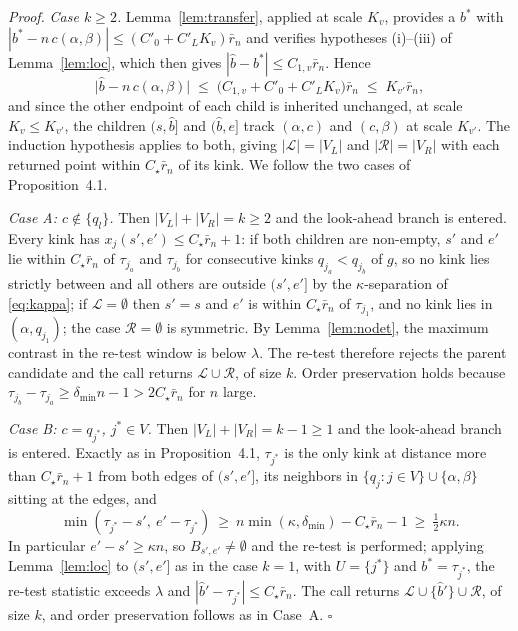 \documentclass[12pt, a4paper]{article}
\newcommand{\qed}{\hfill$\square$}
\newenvironment{proof}[1][Proof]{\par\noindent\textit{#1.}\space}{\qed\par\medskip}
\newcommand{\proppop}{Proposition~4.1}
\begin{document}
\begin{proof}
\emph{Case $k \ge 2$.} Lemma~\ref{lem:transfer}, applied at scale $K_v$,
provides a $b^*$ with
$|b^*-n\,c(\alpha,\beta)|\le(C'_0+C'_LK_v)\bar r_n$ and verifies hypotheses
(i)--(iii) of Lemma~\ref{lem:loc}, which then gives
$|\hat b-b^*|\le C_{1,v}\bar r_n$. Hence
\[
\big| \hat b - n\,c(\alpha,\beta) \big| \;\le\; \big( C_{1,v} + C'_0 + C'_L K_v \big)\bar r_n \;\le\; K_{v'}\bar r_n ,
\]
and since the other endpoint of each child is inherited unchanged, at scale $K_v \le K_{v'}$, the children $(s,\hat b]$ and $(\hat b,e]$ track $(\alpha,c)$ and $(c,\beta)$ at scale $K_{v'}$. The induction hypothesis applies to both, giving $|\mathcal{L}| = |V_L|$ and $|\mathcal{R}| = |V_R|$ with each returned point within $C_\star\bar r_n$ of its kink. We follow the two cases of \proppop{}.

\emph{Case A: $c \notin \{q_l\}$.} Then $|V_L|+|V_R| = k \ge 2$ and the
look-ahead branch is entered. Every kink has $x_j(s',e') \le C_\star\bar r_n+1$:
if both children are non-empty, $s'$ and $e'$ lie within $C_\star\bar r_n$ of
$\tau_{j_a}$ and $\tau_{j_b}$ for consecutive kinks $q_{j_a} < q_{j_b}$ of $g$,
so no kink lies strictly between and all others are outside $(s',e']$ by the
$\kappa$-separation of \eqref{eq:kappa}; if $\mathcal{L} = \emptyset$ then
$s' = s$ and $e'$ is within $C_\star\bar r_n$ of $\tau_{j_1}$, and no kink lies
in $(\alpha, q_{j_1})$; the case $\mathcal{R} = \emptyset$ is symmetric. By
Lemma~\ref{lem:nodet}, the maximum contrast in the re-test window is below
$\lambda$. The re-test therefore rejects the parent candidate and the call returns
$\mathcal{L}\cup\mathcal{R}$, of size $k$. Order preservation holds because
$\tau_{j_b} - \tau_{j_a} \ge \delta_{\min}n - 1 > 2C_\star\bar r_n$ for $n$
large.

\emph{Case B: $c = q_{j^*}$, $j^* \in V$.} Then $|V_L|+|V_R| = k-1 \ge 1$ and
the look-ahead branch is entered. Exactly as in \proppop{}, $\tau_{j^*}$ is the
only kink at distance more than $C_\star\bar r_n + 1$ from both edges of
$(s',e']$, its neighbors in $\{q_j : j\in V\}\cup\{\alpha,\beta\}$ sitting at
the edges, and
\[
\min(\tau_{j^*} - s',\ e' - \tau_{j^*}) \ \ge\
n\min(\kappa,\delta_{\min}) - C_\star\bar r_n - 1 \ \ge\ \tfrac12\kappa n .
\]
In particular $e'-s' \ge \kappa n$, so $B_{s',e'} \ne \emptyset$ and the
re-test is performed; applying Lemma~\ref{lem:loc} to $(s',e']$ as in the case
$k=1$, with $U = \{j^*\}$ and $b^* = \tau_{j^*}$, the re-test statistic exceeds
$\lambda$ and $|\hat b' - \tau_{j^*}| \le C_\star\bar r_n$. The call returns
$\mathcal{L}\cup\{\hat b'\}\cup\mathcal{R}$, of size $k$, and order
preservation follows as in Case~A.
\end{proof}
\end{document}
